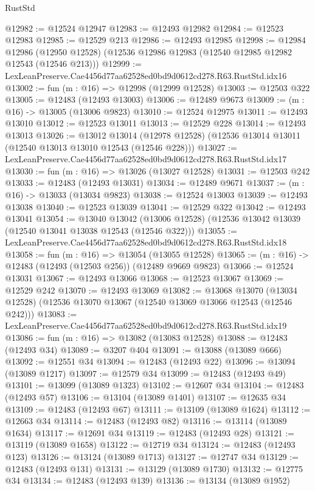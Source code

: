 \begin{lexlean}{RustStd}
\begin{coremodule}
@12982 := @12524 @12947
@12983 := @12493 @12982
@12984 := @12523 @12983
@12985 := @12529 @213
@12986 := @12493 @12985
@12998 := @12984
    @12986
    (@12950 @12528)
    (@12536 @12986 @12983 (@12540 @12985 @12982 @12543 (@12546 @213)))
@12999 := LexLeanPreserve.Cae4456d77aa62528ed0bd9d0612cd278.R63.RustStd.idx16
@13002 := fun (m : @16) => @12998 (@12999 @12528)
@13003 := @12503 @322
@13005 := @12483 (@12493 @13003)
@13006 := @12489 @9673
@13009 := (m : @16) -> @13005 (@13006 @9823)
@13010 := @12524 @12975
@13011 := @12493 @13010
@13012 := @12523 @13011
@13013 := @12529 @228
@13014 := @12493 @13013
@13026 := @13012
    @13014
    (@12978 @12528)
    (@12536 @13014 @13011 (@12540 @13013 @13010 @12543 (@12546 @228)))
@13027 := LexLeanPreserve.Cae4456d77aa62528ed0bd9d0612cd278.R63.RustStd.idx17
@13030 := fun (m : @16) => @13026 (@13027 @12528)
@13031 := @12503 @242
@13033 := @12483 (@12493 @13031)
@13034 := @12489 @9671
@13037 := (m : @16) -> @13033 (@13034 @9823)
@13038 := @12524 @13003
@13039 := @12493 @13038
@13040 := @12523 @13039
@13041 := @12529 @322
@13042 := @12493 @13041
@13054 := @13040
    @13042
    (@13006 @12528)
    (@12536 @13042 @13039 (@12540 @13041 @13038 @12543 (@12546 @322)))
@13055 := LexLeanPreserve.Cae4456d77aa62528ed0bd9d0612cd278.R63.RustStd.idx18
@13058 := fun (m : @16) => @13054 (@13055 @12528)
@13065 := (m : @16) -> @12483 (@12493 (@12503 @256)) (@12489 @9669 @9823)
@13066 := @12524 @13031
@13067 := @12493 @13066
@13068 := @12523 @13067
@13069 := @12529 @242
@13070 := @12493 @13069
@13082 := @13068
    @13070
    (@13034 @12528)
    (@12536 @13070 @13067 (@12540 @13069 @13066 @12543 (@12546 @242)))
@13083 := LexLeanPreserve.Cae4456d77aa62528ed0bd9d0612cd278.R63.RustStd.idx19
@13086 := fun (m : @16) => @13082 (@13083 @12528)
@13088 := @12483 (@12493 @34)
@13089 := @3207 @404
@13091 := @13088 (@13089 @666)
@13092 := @12551 @34
@13094 := @12483 (@12493 @22)
@13096 := @13094 (@13089 @1217)
@13097 := @12579 @34
@13099 := @12483 (@12493 @49)
@13101 := @13099 (@13089 @1323)
@13102 := @12607 @34
@13104 := @12483 (@12493 @57)
@13106 := @13104 (@13089 @1401)
@13107 := @12635 @34
@13109 := @12483 (@12493 @67)
@13111 := @13109 (@13089 @1624)
@13112 := @12663 @34
@13114 := @12483 (@12493 @82)
@13116 := @13114 (@13089 @1634)
@13117 := @12691 @34
@13119 := @12483 (@12493 @28)
@13121 := @13119 (@13089 @1658)
@13122 := @12719 @34
@13124 := @12483 (@12493 @123)
@13126 := @13124 (@13089 @1713)
@13127 := @12747 @34
@13129 := @12483 (@12493 @131)
@13131 := @13129 (@13089 @1730)
@13132 := @12775 @34
@13134 := @12483 (@12493 @139)
@13136 := @13134 (@13089 @1952)

\end{coremodule}
\end{lexlean}
